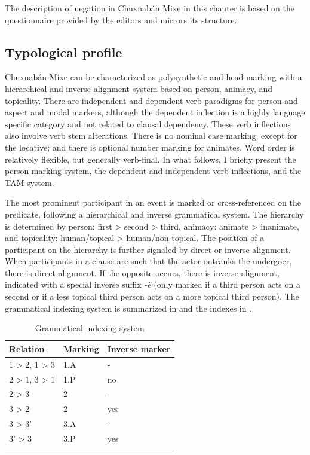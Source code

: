 \documentclass[output=paper,colorlinks,citecolor=brown,draft]{langscibook}
\begin{document}
The description of negation in Chuxnabán Mixe in this chapter is based on the questionnaire provided by the editors  and mirrors its structure.

\subsection{Typological profile}\label{sec:mix:1.2}

Chuxnabán Mixe can be characterized as polysynthetic and head-marking with a hierarchical and inverse alignment system based on person, animacy, and topicality. There are independent and dependent verb paradigms for person and aspect and modal markers, although the dependent inflection is a highly language specific category and not related to clausal dependency. These verb inflections also involve verb stem alterations. There is no nominal case marking, except for the locative; and there is optional number marking for animates. Word order is relatively flexible, but generally verb-final. In what follows, I briefly present the person marking system, the dependent and independent verb inflections, and the TAM system. 

The most prominent participant in an event is marked or cross-referenced on the predicate, following a hierarchical and inverse grammatical system. The hierarchy is determined by person: first > second > third, animacy: animate > inanimate, and topicality: human/topical > human/non-topical. The position of a participant on the hierarchy is further signaled by direct or inverse alignment. When participants in a clause are such that the actor outranks the undergoer, there is direct alignment. If the opposite occurs, there is inverse alignment, indicated with a special inverse suffix \textit{-ë} (only marked if a third person acts on a second or if a less topical third person acts on a more topical third person). The grammatical indexing system is summarized in  and the indexes in . 

\begin{table}
\begin{tabularx}{0.55\textwidth}{lll}
\lsptoprule
{Relation} & {Marking} & {Inverse marker}\\
\midrule
{1 > 2, 1 > 3} & {1.A} & {{}-}\\
{2 > 1, 3 > 1} & {1.P} & {no}\\
{2 > 3} & {2} & {{}-}\\
{3 > 2} & {2} & {yes}\\
{3 > 3’} & {3.A} & {{}-}\\
{3’ > 3} & {3.P} & {yes}\\
\lspbottomrule
\end{tabularx}
\caption{Grammatical indexing system}
\label{tab:mix:1}
\end{table}
\end{document}
